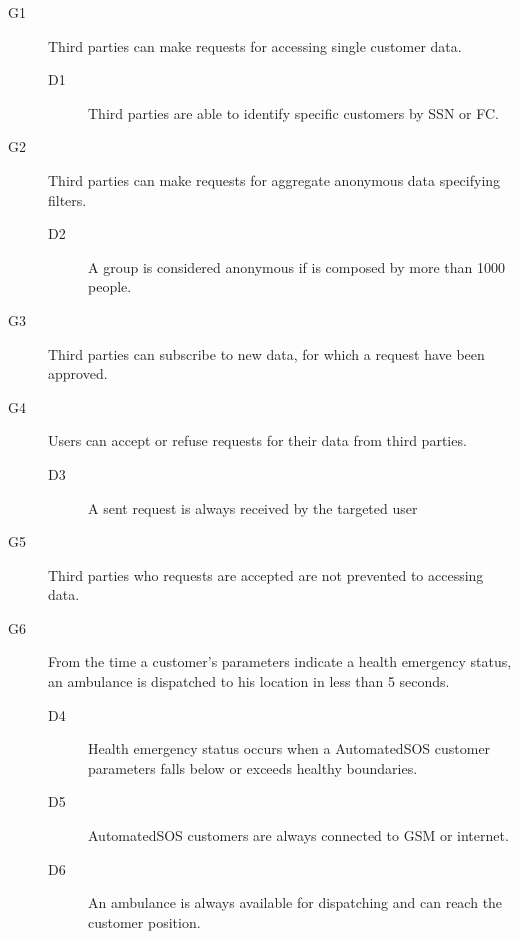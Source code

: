 \documentclass[../main.tex]{subfiles}
\begin{document}
\begin{description}

	\item [G1] Third parties can make requests for accessing single customer data.
	\begin{description}
		\item [D1] Third parties are able to identify specific customers by SSN or FC.
	\end{description}

	\item [G2] Third parties can make requests for aggregate anonymous data specifying filters.
	\begin{description}
		\item [D2] A group is considered anonymous if is composed by more than 1000 people.
	\end{description}

	\item [G3] Third parties can subscribe to new data, for which a request have been approved.
	\begin{description}
		\item
	\end{description}

	\item [G4]  Users can accept or refuse requests for their data from third parties.
	\begin{description}
		\item [D3]  A sent request is always received by the targeted user
	\end{description}

	\item [G5]  Third parties who requests are accepted are not prevented to accessing data.
	\begin{description}
		\item
	\end{description}

	\item [G6]  From the time a customer's parameters indicate a health emergency status, an ambulance is dispatched to his location in less than 5 seconds.
	\begin{description}
		\item [D4] Health emergency status occurs when a AutomatedSOS customer parameters falls below or exceeds healthy boundaries.
		\item [D5] AutomatedSOS customers are always connected to GSM or internet.
		\item [D6] An ambulance is always available for dispatching and can reach the customer position.
	\end{description}


\end{description}
\end{document}

